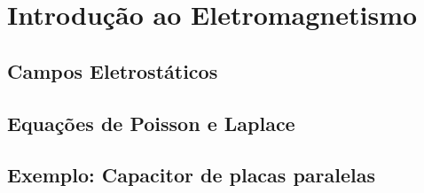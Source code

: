 \section{Introdução ao Eletromagnetismo}

\subsection{Campos Eletrostáticos}

\subsection{Equações de Poisson e Laplace}

\subsection{Exemplo: Capacitor de placas paralelas}